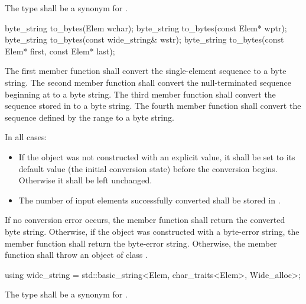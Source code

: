 \begin{itemdescr}
\pnum
The type shall be a synonym for .
\end{itemdescr}

%
\begin{itemdecl}
byte_string to_bytes(Elem wchar);
byte_string to_bytes(const Elem* wptr);
byte_string to_bytes(const wide_string& wstr);
byte_string to_bytes(const Elem* first, const Elem* last);
\end{itemdecl}

\begin{itemdescr}
\pnum
\effects
The first member function shall convert the single-element sequence  to a byte string.
The second member function shall convert the null-terminated sequence beginning at  to
a byte string. The third member function shall convert the sequence stored in  to a
byte string. The fourth member function shall convert the sequence defined by the
range  to a byte string.

\pnum
In all cases:

\begin{itemize}
\item If the  object was not constructed with an explicit value, it
shall be
set to its default value (the initial conversion state) before the
conversion begins. Otherwise it shall be left unchanged.
\item The number of input elements successfully converted shall be stored
in .
\end{itemize}

\pnum
\returns
If no conversion error occurs, the member function shall return the converted byte string.
Otherwise, if the object was constructed with a byte-error string, the
member function shall return the byte-error string.
Otherwise, the member function shall throw an object of class .
\end{itemdescr}

%
\begin{itemdecl}
using wide_string = std::basic_string<Elem, char_traits<Elem>, Wide_alloc>;
\end{itemdecl}

\begin{itemdescr}
\pnum
The type shall be a synonym for .
\end{itemdescr}

